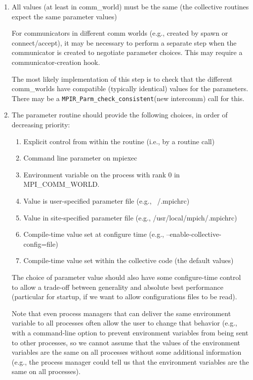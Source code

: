 \documentclass{report}
\begin{document}
\begin{enumerate}
\item All values (at least in comm\_world) must be the same (the
      collective routines expect the same parameter values)


      For communicators in different comm worlds (e.g., created by
      spawn or connect/accept), it may be necessary to perform a
      separate step when the communicator is created to negotiate
      parameter choices.  This may require a communicator-creation
      hook.

      The most likely implementation of this step is to check that the
      different comm\_worlds have compatible (typically identical)
      values for the parameters.  There may be a
      \texttt{MPIR\_Parm\_check\_consistent}(new intercomm) call for this.

\item The parameter routine should provide the following choices, in
      order of decreasing priority:
     
\begin{enumerate}
\item Explicit control from within the routine (i.e., by a routine
      call)
\item Command line parameter on mpiexec
\item Environment variable on the process with rank 0 in MPI\_COMM\_WORLD.
\item Value is user-specified parameter file (e.g., ~/.mpichrc)
\item Value in site-specified parameter file (e.g.,
      /usr/local/mpich/.mpichrc)
\item Compile-time value set at configure time (e.g.,
      --enable-collective-config=file) 
\item Compile-time value set within the collective code (the
      default values)
\end{enumerate}
      The choice of parameter value should also have some configure-time
      control to allow a trade-off between generality and absolute
      best performance (particular for startup, if we want to allow
      configurations files to be read).

      Note that even process managers that can deliver the same
      environment variable to all processes often allow the user to
      change that behavior (e.g., with a command-line option to
      prevent environment variables from being sent to other
      processes, so we cannot assume that the values of the
      environment variables are the same on all processes without some
      additional information (e.g., the process manager could tell us
      that the environment variables are the same on all processes).


\end{enumerate}
\end{document}
